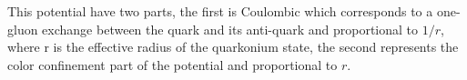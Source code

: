 This potential have two
parts, the first is Coulombic which corresponds to a one-gluon exchange between
the quark and its anti-quark and proportional to $1/r$, where r is the
effective radius of the quarkonium state, the second represents the color
confinement part of the potential and proportional to $r$. 